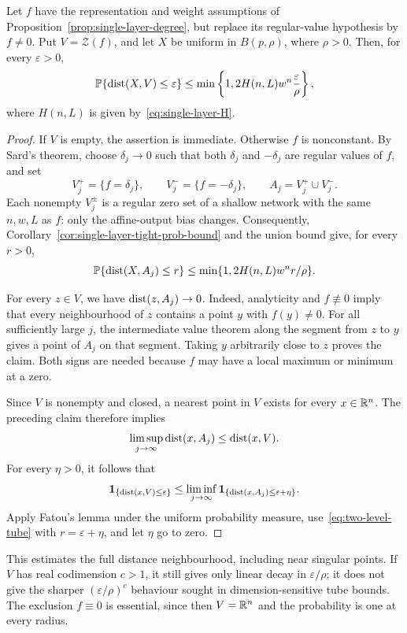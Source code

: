 \begin{corollary}\label{cor:single-layer-singular-linear}
Let $f$ have the representation and weight assumptions of Proposition~\ref{prop:single-layer-degree}, but replace its regular-value hypothesis by $f\neq0$. Put $V=\mathcal Z(f)$, and let $X$ be uniform in $B(p,\rho)$, where $\rho>0$. Then, for every $\varepsilon>0$,
\[
\operatorname*{\mathbb{P}}\{\operatorname{dist}(X,V)\le\varepsilon\}
\le\min\left\{1,2H(n,L)w^n\frac{\varepsilon}{\rho}\right\},
\]
where $H(n,L)$ is given by~\eqref{eq:single-layer-H}.
\end{corollary}

\begin{proof}
If $V$ is empty, the assertion is immediate. Otherwise $f$ is nonconstant. By Sard's theorem, choose $\delta_j\rightarrow 0$ such that both $\delta_j$ and $-\delta_j$ are regular values of $f$, and set
\[
V_j^+=\{f=\delta_j\},\qquad
V_j^-=\{f=-\delta_j\},\qquad A_j=V_j^+\cup V_j^-.
\]
Each nonempty $V_j^\pm$ is a regular zero set of a shallow network with the same $n,w,L$ as $f$: only the affine-output bias changes. Consequently, Corollary~\ref{cor:single-layer-tight-prob-bound} and the union bound give, for every $r>0$,
\begin{equation}\label{eq:two-level-tube}
\operatorname*{\mathbb{P}}\{\operatorname{dist}(X,A_j)\le r\}
\le\min\{1,2H(n,L)w^n r/\rho\}.
\end{equation}

For every $z\in V$, we have $\operatorname{dist}(z,A_j)\to0$. Indeed, analyticity and $f\not\equiv0$ imply that every neighbourhood of $z$ contains a point $y$ with $f(y)\ne0$. For all sufficiently large $j$, the intermediate value theorem along the segment from $z$ to $y$ gives a point of $A_j$ on that segment. Taking $y$ arbitrarily close to $z$ proves the claim. Both signs are needed because $f$ may have a local maximum or minimum at a zero.

Since $V$ is nonempty and closed, a nearest point in $V$ exists for every $x\in\mathbb{R}^n$. The preceding claim therefore implies
\[
\limsup_{j\to\infty}\operatorname{dist}(x,A_j)\le\operatorname{dist}(x,V).
\]
For every $\eta>0$, it follows that
\[
\mathbf1_{\{\operatorname{dist}(x,V)\le\varepsilon\}}
\le\liminf_{j\to\infty}
\mathbf1_{\{\operatorname{dist}(x,A_j)\le\varepsilon+\eta\}}.
\]
Apply Fatou's lemma under the uniform probability measure, use~\eqref{eq:two-level-tube} with $r=\varepsilon+\eta$, and let $\eta$ go to zero.
\end{proof}

\begin{remark}
This estimates the full distance neighbourhood, including near singular points. If $V$ has real codimension $c>1$, it still gives only linear decay in $\varepsilon/\rho$; it does not give the sharper $(\varepsilon/\rho)^c$ behaviour sought in dimension-sensitive tube bounds. The exclusion $f\equiv0$ is essential, since then $V=\mathbb{R}^n$ and the probability is one at every radius.
\end{remark}
